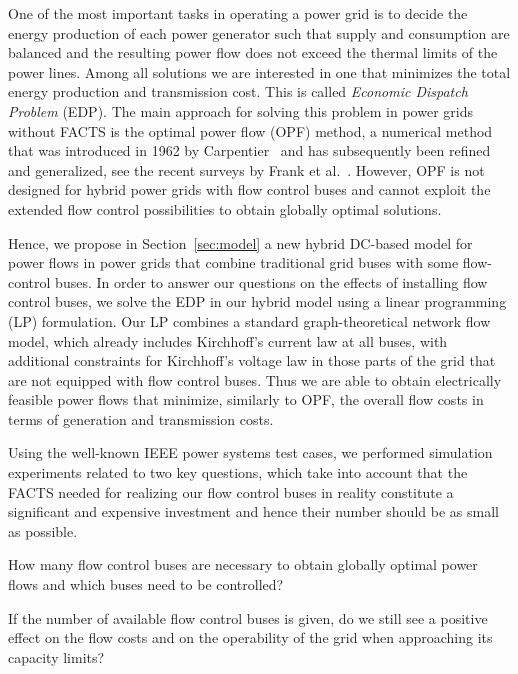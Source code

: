 \documentclass{article}[11pt,a4paper]
\newcommand{\EDP}{EDP\xspace}
\begin{document}
One of the most important tasks in operating a power grid is to decide the energy production of each power generator such that supply and consumption are balanced and the resulting power flow does not exceed the thermal limits of the power lines. 
Among all solutions we are interested in one that minimizes the total energy production and transmission cost. 
This is called \emph{Economic Dispatch Problem} (EDP).
The main approach for solving this problem in power grids without FACTS is the optimal power flow (OPF) method, a numerical method that was introduced in 1962 by Carpentier~\cite{Carpentier62} and has subsequently been refined and generalized, see the recent surveys by Frank et al.~\cite{SurveyOPF1,SurveyOPF2}. 
However, OPF is not designed for hybrid power grids with flow control buses and cannot exploit the extended flow control possibilities to obtain globally optimal solutions. 

Hence, we propose in Section~\ref{sec:model} a new hybrid DC-based model for power flows in power grids that combine traditional grid buses with some flow-control buses.
In order to answer our questions on the effects of installing flow control buses, we solve the \EDP in our hybrid model using a linear programming (LP) formulation.
Our LP combines a standard graph-theoretical network flow model, which already includes Kirchhoff's current law at all buses, with additional constraints for Kirchhoff's voltage law in those parts of the grid that are not equipped with flow control buses. Thus we are able to obtain electrically feasible power flows that minimize, similarly to OPF, the overall flow costs in terms of generation and transmission costs.

Using the well-known IEEE power systems test cases, we performed simulation experiments related to two key questions, which take into account that the FACTS needed for realizing our flow control buses in reality constitute a significant and expensive investment and hence their number should be as small as possible. 
\begin{compactenum}
	\item How many flow control buses are necessary to obtain globally optimal power flows and which buses need to be controlled?
	\item If the number of available flow control buses is given, do we still see a positive effect on the flow costs and on the operability of the grid when approaching its capacity limits?
\end{compactenum}
\end{document}
